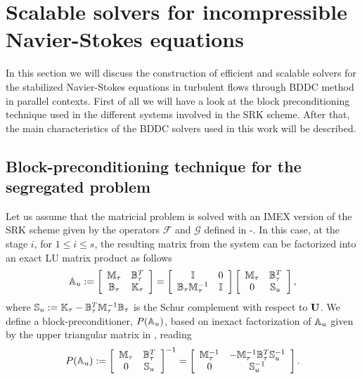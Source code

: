\section{Scalable solvers for incompressible Navier-Stokes equations}
\label{sec-C7_solver}
In this section we will discuss the construction of efficient and scalable solvers for the stabilized Navier-Stokes equations in turbulent flows through BDDC method in parallel contexts. First of all we will have a look at the block preconditioning technique used in the different systems involved in the SRK scheme. After that, the main characteristics of the BDDC solvers used in this work will be described.

\subsection{Block-preconditioning technique for the segregated problem}
\label{subsec-C7_block_prec}
Let us assume that the matricial problem  is solved with an IMEX version of the SRK scheme given by the operators $ \mathcal{F} $ and $ \mathcal{G} $ defined in -. In this case, at the stage $ i $, for $ 1\le i \le s $, the resulting matrix from the system  can be factorized into an exact LU matrix product as follows
\begin{equation}
\label{eq-C7_SRK_u_mat}
\mathbb{A}_u:=\left[\begin{array}{cc}
\mathbb{M}_\tau&\mathbb{B}_\tau^T\\
\mathbb{B}_\tau&\mathbb{K}_\tau
\end{array}\right]=\left[\begin{array}{cc}
\mathbb{I}&0\\
\mathbb{B}_\tau\mathbb{M}_\tau^{-1}&\mathbb{I}
\end{array}\right]\left[\begin{array}{cc}
\mathbb{M}_\tau&\mathbb{B}_\tau^T\\
0&\mathbb{S}_u
\end{array}\right],
\end{equation}
where $ \mathbb{S}_u:=\mathbb{K}_\tau-\mathbb{B}_\tau^T\mathbb{M}_\tau^{-1}\mathbb{B}_\tau$ is the Schur complement with respect to ${\bf U}$. We define a block-preconditioner, $ P(\mathbb{A}_u) $, based on inexact factorization of $ \mathbb{A}_u $ given by the upper triangular matrix in , reading
\begin{equation}
\label{eq-C7_SRK_u_prec}
P(\mathbb{A}_u):=\left[\begin{array}{cc}
\mathbb{M}_\tau&\mathbb{B}_\tau^T\\
0&\mathbb{S}_u
\end{array}\right]^{-1}=\left[\begin{array}{cc}
\mathbb{M}_\tau^{-1}&-\mathbb{M}_\tau^{-1}\mathbb{B}_\tau^T\mathbb{S}_u^{-1}\\
0&\mathbb{S}_u^{-1}
\end{array}\right].
\end{equation}

